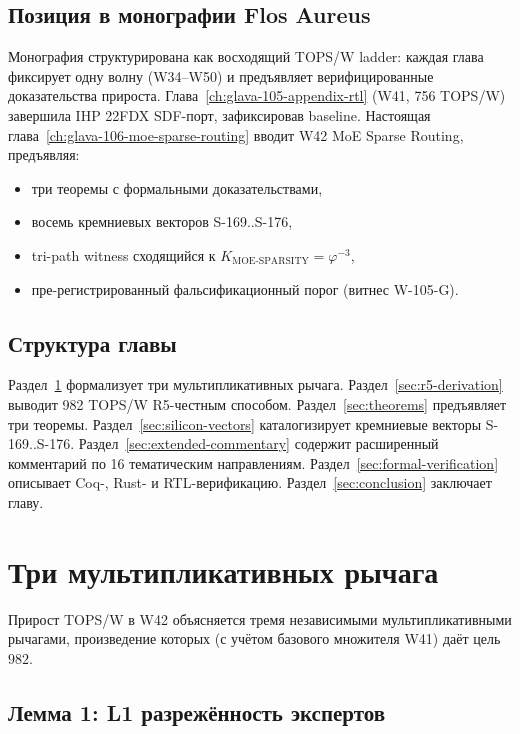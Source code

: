 \subsection{Позиция в монографии Flos Aureus}

Монография структурирована как восходящий TOPS/W ladder: каждая глава фиксирует одну волну (W34--W50) и предъявляет верифицированные доказательства прироста. Глава~\ref{ch:glava-105-appendix-rtl} (W41, 756 TOPS/W) завершила IHP 22FDX SDF-порт, зафиксировав baseline. Настоящая глава~\ref{ch:glava-106-moe-sparse-routing} вводит W42 MoE Sparse Routing, предъявляя:
\begin{itemize}
  \item три теоремы с формальными доказательствами,
  \item восемь кремниевых векторов S-169..S-176,
  \item tri-path witness сходящийся к $K_{\text{MOE-SPARSITY}} = \varphi^{-3}$,
  \item пре-регистрированный фальсификационный порог (витнес W-105-G).
\end{itemize}

\subsection{Структура главы}

Раздел~\ref{sec:levers} формализует три мультипликативных рычага. Раздел~\ref{sec:r5-derivation} выводит 982 TOPS/W R5-честным способом. Раздел~\ref{sec:theorems} предъявляет три теоремы. Раздел~\ref{sec:silicon-vectors} каталогизирует кремниевые векторы S-169..S-176. Раздел~\ref{sec:extended-commentary} содержит расширенный комментарий по 16 тематическим направлениям. Раздел~\ref{sec:formal-verification} описывает Coq-, Rust- и RTL-верификацию. Раздел~\ref{sec:conclusion} заключает главу.

\section{Три мультипликативных рычага}
\label{sec:levers}

Прирост TOPS/W в W42 объясняется тремя независимыми мультипликативными рычагами, произведение которых (с учётом базового множителя W41) даёт цель $982$.

\subsection{Лемма 1: L1 разрежённость экспертов}

